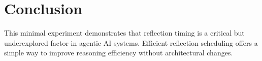 \documentclass[conference]{IEEEtran}
\begin{document}
\section{Conclusion}
This minimal experiment demonstrates that reflection timing
is a critical but underexplored factor in agentic AI systems.
Efficient reflection scheduling offers a simple way
to improve reasoning efficiency without architectural changes.




\end{document}
